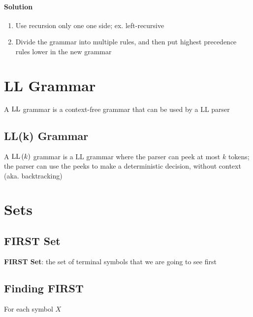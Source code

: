     \paragraph{Solution}
    \begin{enumerate}
      \item Use recursion only one one side; ex. left-recursive
      \item Divide the grammar into multiple rules, and then put highest
      precedence rules lower in the new grammar
    \end{enumerate}

\section{LL Grammar}

  \begin{definition}
    A $ \operatorname{LL} $ grammar is a context-free grammar that can be used by a LL parser
  \end{definition}

  \subsection{LL(k) Grammar}

    \begin{definition}
      A $ \operatorname{LL}\left( k \right) $ grammar is a LL grammar where the parser can
      peek at most $ k $ tokens; the parser can use the peeks to make a
      deterministic decision, without context (aka. backtracking)
    \end{definition}

\section{Sets}
  \subsection{FIRST Set}

    \begin{definition}
      \textbf{FIRST Set}: the set of terminal symbols that we are going to see
      first
    \end{definition}

    \subsection{Finding FIRST}

      For each symbol $ X $

